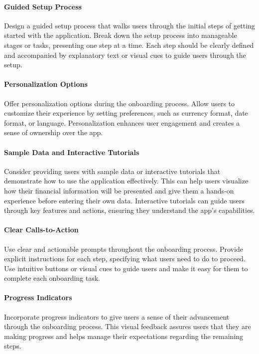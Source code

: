 \paragraph{Guided Setup Process}
Design a guided setup process that walks users through the initial steps of getting started with 
the application. Break down the setup process into manageable stages or tasks, presenting one step at a time. Each 
step should be clearly defined and accompanied by explanatory text or visual cues to guide users through the setup.

\paragraph{Personalization Options}
Offer personalization options during the onboarding process. Allow users to 
customize their experience by setting preferences, such as currency format, date format, or language. Personalization 
enhances user engagement and creates a sense of ownership over the app.

\paragraph{Sample Data and Interactive Tutorials}
Consider providing users with sample data or interactive tutorials that 
demonstrate how to use the application effectively. This can help users visualize how their financial information 
will be presented and give them a hands-on experience before entering their own data. Interactive tutorials can 
guide users through key features and actions, ensuring they understand the app's capabilities.

\paragraph{Clear Calls-to-Action}
Use clear and actionable prompts throughout the onboarding process. Provide explicit 
instructions for each step, specifying what users need to do to proceed. Use intuitive buttons or visual cues 
to guide users and make it easy for them to complete each onboarding task.

\paragraph{Progress Indicators}
Incorporate progress indicators to give users a sense of their advancement through the onboarding 
process. This visual feedback assures users that they are making progress and helps manage their expectations regarding 
the remaining steps.

